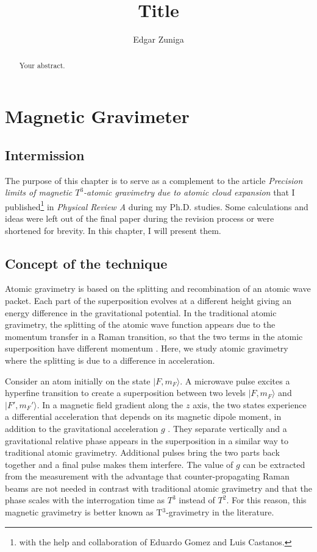 \documentclass{article}
\title{Title}
\author{Edgar Zuniga}
\begin{document}
\maketitle
\tableofcontents

\begin{abstract}
Your abstract.
\end{abstract}

\section{Magnetic Gravimeter}
\subsection{Intermission}
The purpose of this chapter is to serve as a complement to the article \textit{Precision limits of magnetic $T^3$-atomic gravimetry due to atomic cloud expansion} that I published\footnote{with the help and collaboration of Eduardo Gomez and Luis Castanos.} in \textit{Physical Review A} \cite{edgarMagneticGravimeter} during my Ph.D. studies. Some calculations and ideas were left out of the final paper during the revision process or were shortened for brevity. In this chapter, I will present them.

\subsection{Concept of the technique}
Atomic gravimetry is based on the splitting and recombination of an atomic wave packet. Each part of the superposition evolves at a different height giving an energy difference in the gravitational potential. In the traditional atomic gravimetry, the splitting of the atomic wave function appears due to the momentum transfer in a Raman transition, so that the two terms in the atomic superposition have different momentum \cite{Kasevich1992}. Here, we study atomic gravimetry where the splitting is due to a difference in acceleration.

Consider an atom initially on the state $|F,m_F \rangle$. A microwave pulse excites a hyperfine transition to create a superposition between two levels $|F,m_F \rangle$ and $|F',m_F' \rangle$. In a magnetic field gradient along the $z$ axis, the two states experience a differential acceleration that depends on its magnetic dipole moment, in addition to the gravitational acceleration $g$ \cite{Castanos2014}. They separate vertically and a gravitational relative phase appears in the superposition in a similar way to traditional atomic gravimetry. Additional pulses bring the two parts back together and a final pulse makes them interfere. The value of $g$ can be extracted from the measurement with the advantage that counter-propagating Raman beams are not needed in contrast with traditional atomic gravimetry and that the phase scales with the interrogation time as $T^3$ instead of $T^2$. For this reason, this magnetic gravimetry is better known as T$^3$-gravimetry in the literature.
\end{document}
